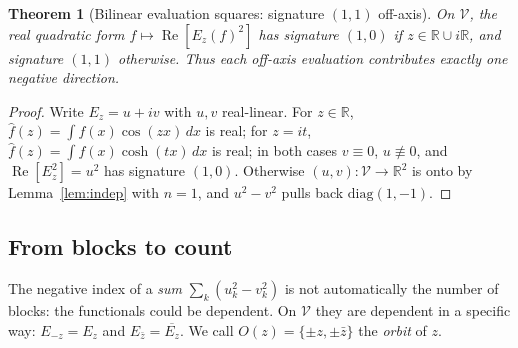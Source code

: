 \documentclass[11pt]{amsart}
\newtheorem{theorem}{Theorem}[section]
\theoremstyle{definition}
\theoremstyle{remark}
\renewcommand{\Re}{\operatorname{Re}}
\newcommand{\fhat}{\widehat f}
\begin{document}
\begin{theorem}[Bilinear evaluation squares: signature $(1,1)$ off-axis]\label{thm:F}
On $\mathcal V$, the real quadratic form $f\mapsto\Re[E_z(f)^2]$ has signature $(1,0)$ if
$z\in\mathbb R\cup i\mathbb R$, and signature $(1,1)$ otherwise. Thus each off-axis evaluation
contributes exactly one negative direction.
\end{theorem}
\begin{proof}
Write $E_z=u+iv$ with $u,v$ real-linear. For $z\in\mathbb R$, $\fhat(z)=\int f(x)\cos(zx)\,dx$
is real; for $z=it$, $\fhat(z)=\int f(x)\cosh(tx)\,dx$ is real; in both cases $v\equiv0$,
$u\not\equiv0$, and $\Re[E_z^2]=u^2$ has signature $(1,0)$. Otherwise $(u,v):\mathcal V\to
\mathbb R^2$ is onto by Lemma~\ref{lem:indep} with $n=1$, and $u^2-v^2$ pulls back
$\mathrm{diag}(1,-1)$.
\end{proof}

\subsection{From blocks to count}
The negative index of a \emph{sum} $\sum_k(u_k^2-v_k^2)$ is not automatically the number of
blocks: the functionals could be dependent. On $\mathcal V$ they are dependent in a specific
way: $E_{-z}=E_z$ and $E_{\bar z}=\overline{E_z}$. We call $O(z)=\{\pm z,\pm\bar z\}$ the
\emph{orbit} of $z$.
\end{document}
